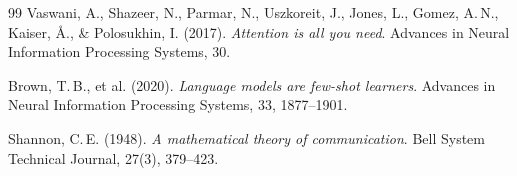 ﻿\documentclass[a4paper,12pt]{article}
\theoremstyle{definition}
\begin{document}
\begin{thebibliography}{99}
Vaswani, A., Shazeer, N., Parmar, N., Uszkoreit, J., Jones, L., Gomez, A.\,N.,
Kaiser, Å., \& Polosukhin, I. (2017).
\textit{Attention is all you need}.
Advances in Neural Information Processing Systems, 30.

Brown, T.\,B., et al. (2020).
\textit{Language models are few-shot learners}.
Advances in Neural Information Processing Systems, 33, 1877--1901.

Shannon, C.\,E. (1948).
\textit{A mathematical theory of communication}.
Bell System Technical Journal, 27(3), 379--423.

\end{thebibliography}
\end{document}
